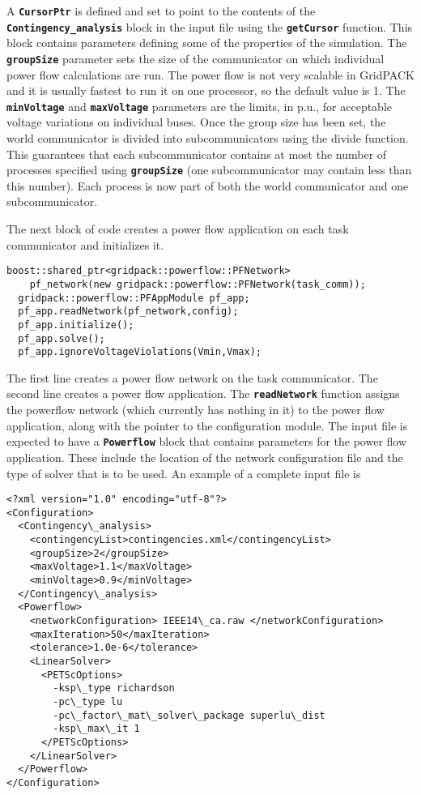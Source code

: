 A \texttt{\textbf{CursorPtr}} is defined and set to point to the contents of the
\texttt{\textbf{Contingency\_analysis}} block in the input file using the
\texttt{\textbf{getCursor}} function. This block contains parameters defining
some of the properties of the simulation. The \texttt{\textbf{groupSize}}
parameter sets the size of the communicator on which individual power flow
calculations are run. The power flow is not very scalable in GridPACK and it is
usually fastest to run it on one processor, so the default value is 1. The
\texttt{\textbf{minVoltage}} and \texttt{\textbf{maxVoltage}} parameters are the
limits, in p.u., for acceptable voltage variations on individual buses. Once the
group size has been set, the world communicator is divided into subcommunicators
using the divide function. This guarantees that each subcommunicator contains at
most the number of processes specified using \texttt{\textbf{groupSize}} (one
subcommunicator may contain less than this number). Each process is now part of
both the world communicator and one subcommunicator.

The next block of code creates a power flow application on each task communicator and initializes it.

{
\color{red}
\begin{Verbatim}[fontseries=b]
  boost::shared_ptr<gridpack::powerflow::PFNetwork>
    pf_network(new gridpack::powerflow::PFNetwork(task_comm));
  gridpack::powerflow::PFAppModule pf_app;
  pf_app.readNetwork(pf_network,config);
  pf_app.initialize();
  pf_app.solve();
  pf_app.ignoreVoltageViolations(Vmin,Vmax);
\end{Verbatim}
}

The first line creates a power flow network on the task communicator. The second line creates a power flow application. The \texttt{\textbf{readNetwork}} function assigns the powerflow network (which currently has nothing in it) to the power flow application, along with the pointer to the configuration module. The input file is expected to have a \texttt{\textbf{Powerflow}} block that contains parameters for the  power flow application. These include the location of the network configuration file and the type of solver that is to be used. An example of a complete input file is

{
\color{blue}
\begin{Verbatim}[fontseries=b]
<?xml version="1.0" encoding="utf-8"?>
<Configuration>
  <Contingency\_analysis>
    <contingencyList>contingencies.xml</contingencyList>
    <groupSize>2</groupSize>
    <maxVoltage>1.1</maxVoltage>
    <minVoltage>0.9</minVoltage>
  </Contingency\_analysis>
  <Powerflow>
    <networkConfiguration> IEEE14\_ca.raw </networkConfiguration>
    <maxIteration>50</maxIteration>
    <tolerance>1.0e-6</tolerance>
    <LinearSolver>
      <PETScOptions>
        -ksp\_type richardson
        -pc\_type lu
        -pc\_factor\_mat\_solver\_package superlu\_dist
        -ksp\_max\_it 1
      </PETScOptions>
    </LinearSolver>
  </Powerflow>
</Configuration>
\end{Verbatim}
}

